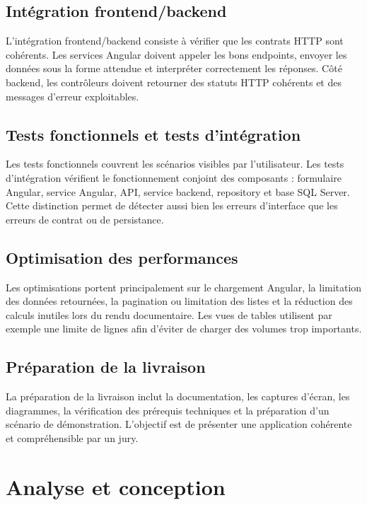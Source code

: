 \subsection{Intégration frontend/backend}

L'intégration frontend/backend consiste à vérifier que les contrats HTTP sont cohérents. Les services Angular doivent appeler les bons endpoints, envoyer les données sous la forme attendue et interpréter correctement les réponses. Côté backend, les contrôleurs doivent retourner des statuts HTTP cohérents et des messages d'erreur exploitables.

\subsection{Tests fonctionnels et tests d'intégration}

Les tests fonctionnels couvrent les scénarios visibles par l'utilisateur. Les tests d'intégration vérifient le fonctionnement conjoint des composants : formulaire Angular, service Angular, API, service backend, repository et base SQL Server. Cette distinction permet de détecter aussi bien les erreurs d'interface que les erreurs de contrat ou de persistance.

\subsection{Optimisation des performances}

Les optimisations portent principalement sur le chargement Angular, la limitation des données retournées, la pagination ou limitation des listes et la réduction des calculs inutiles lors du rendu documentaire. Les vues de tables utilisent par exemple une limite de lignes afin d'éviter de charger des volumes trop importants.

\subsection{Préparation de la livraison}

La préparation de la livraison inclut la documentation, les captures d'écran, les diagrammes, la vérification des prérequis techniques et la préparation d'un scénario de démonstration. L'objectif est de présenter une application cohérente et compréhensible par un jury.

\section{Analyse et conception}

